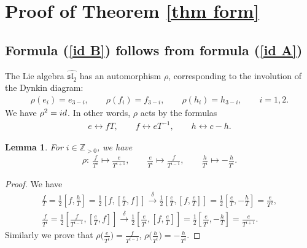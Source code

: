 \documentclass[11pt]{article}
\numberwithin{equation}{section}
\newtheorem{lem}[thm]{Lemma}
\begin{document}
\setcounter{section}{4}
\setcounter{subsection}{6}
\setcounter{subsubsection}{0}
\setcounter{thm}{1}
\setcounter{equation}{5}
\section{Proof of Theorem \ref{thm form}}\label{sec PROOF}

\subsection{Formula (\ref{id B}) follows from formula (\ref{id A})}
The Lie algebra $\widehat{{\mathfrak{sl}_2}}$ has an automorphism $\rho$, corresponding to the involution of the Dynkin diagram:
\begin{gather*}
\rho(e_{i})=e_{3-i}, \qquad \rho(f_{i})=f_{3-i}, \qquad \rho(h_{i})=h_{3-i}, \qquad i=1,2.
\end{gather*}
We have $\rho^2={\rm id}$. In other words, $\rho$ acts by the formulas
\begin{gather*}
e\leftrightarrow fT, \qquad f \leftrightarrow e T^{-1}, \qquad h \leftrightarrow c-h.
\end{gather*}

\begin{lem}\label{lem elts}For $i \in \mathbb{Z}_{> 0}$, we have
\begin{gather*}
\rho \colon \ \frac{f}{T^i} \mapsto \frac{e}{T^{i+1}}, \qquad \frac{e}{T^i} \mapsto \frac{f}{T^{i-1}}, \qquad \frac{h}{T^i} \mapsto -\frac{h}{T^i}.
\end{gather*}
\end{lem}
\begin{proof}
We have
\begin{gather*}
\frac{f}{T} = \frac12 \left[f, \frac hT \right] = \frac 12 \left[ f, \left[\frac eT, f \right] \right] \overset{\delta}{\longrightarrow} \frac 12 \left[ \frac eT, \left[f, \frac eT \right] \right] = \frac 12 \left[ \frac eT, - \frac hT \right] = \frac{e}{T^2}, \nonumber \\
\frac{f}{T^i} = \frac 12 \left[ \frac{f}{T^{i-1}}, \left[\frac{e}{T}, f\right] \right] \overset{\delta}{\longrightarrow} \frac 12 \left[ \frac{e}{T^i}, \left[f, \frac eT \right] \right] = \frac 12 \left[ \frac{e}{T^i}, - \frac hT \right] = \frac{e}{T^{i+1}}. \nonumber
\end{gather*}
Similarly we prove that $\rho\big(\frac{e}{T^i}\big) = \frac{f}{T^{i-1}}$, $\rho \big(\frac{h}{T^i}\big) = -\frac{h}{T^i}$.
\end{proof}
\end{document}
